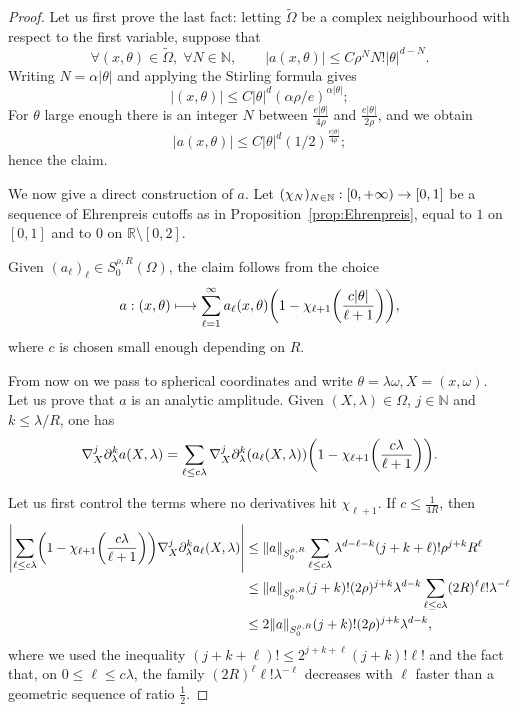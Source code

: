\documentclass[AHL,Unicode,longabstracts,published]{cedram}
\newcommand\1{\mathds{1}}
\newcommand{\R}{\mathbb{R}}
\newcommand{\N}{\mathbb{N}}
\let\oldforall\forall
\renewcommand*{\forall}{\mathrel{\oldforall}}
\renewcommand*{\to}{\mathchoice{\longrightarrow}{\rightarrow}{\rightarrow}{\rightarrow}}
\let\oldmapsto\mapsto
\renewcommand*{\mapsto}{\mathchoice{\longmapsto}{\oldmapsto}{\oldmapsto}{\oldmapsto}}
\let\originalleft\left
\let\originalright\right
\renewcommand{\left}{\mathopen{}\mathclose\bgroup\originalleft}
\renewcommand{\right}{\aftergroup\egroup\originalright}
\begin{document}
\begin{proof}
Let us first prove the last fact: letting $\widetilde{\Omega}$ be a complex neighbourhood with respect to the first variable, suppose that
\[
\forall (x,\theta)\in \widetilde{\Omega}, \;\forall N\in \N,\qquad |a(x,\theta)|\leq C\rho^NN!|\theta|^{d-N}.
\]
Writing $N=\alpha|\theta|$ and applying the Stirling formula gives
\[
|(x,\theta)|\leq C|\theta|^d(\alpha\rho/e)^{\alpha|\theta|} ;
\]
For $\theta$ large enough there is an integer $N$ between $\frac{e|\theta|}{4\rho}$ and $\frac{e|\theta|}{2\rho}$, and we obtain
\[
|a(x,\theta)|\leq C|\theta|^d(1/2)^{\frac{e|\theta|}{4\rho}};
\]
hence the claim.

We now give a direct construction of $a$. Let $(\chi_N)_{N\in \N}:[0,+\infty)\to [0,1]$ be a sequence of Ehrenpreis cutoffs as in Proposition~\ref{prop:Ehrenpreis}, equal to $1$ on $[0,1]$ and to $0$ on $\R\setminus [0,2]$.

Given $(a_\ell)_\ell\in S^{\rho,R}_0(\Omega)$, the claim follows from the choice
\[
a:(x,\theta)\mapsto
\sum_{\ell=1}^{\infty}a_{\ell}(x,\theta)\left(1-\chi_{\ell+1}\left(\frac{c|\theta|}{\ell+1}\right)\right),
\]
where $c$ is chosen small enough depending on $R$.

From now on we pass to spherical coordinates and write $\theta=\lambda\omega,X=(x,\omega)$. Let us prove that $a$ is an analytic amplitude. Given $(X,\lambda)\in \Omega$, $j\in \N$ and $k\leq \lambda/R$, one has
\[
\nabla^j_{X}\partial^k_{\lambda}a(X,\lambda)=\sum_{\ell\leq c\lambda}\nabla^j_{X}\partial^k_{\lambda}(a_{\ell}(X,\lambda))\left(1-\chi_{\ell+1}\left(\frac{c\lambda}{\ell+1}\right)\right).
\]

Let us first control the terms where no derivatives hit $\chi_{\ell+1}$. If $c\leq \frac{1}{4R}$, then
\begin{align*}
\left|\sum_{\ell\leq c\lambda}\left(1-\chi_{\ell+1}\left(\frac{c\lambda}{\ell+1}\right)\right)\nabla^j_{X}\partial^k_{\lambda}a_\ell(X,\lambda)\right| &
\leq \|a\|_{S^{\rho,R}_0}\sum_{\ell\leq c\lambda}\lambda^{d-\ell-k}(j+k+\ell)!\rho^{j+k}R^{\ell}\\
&\leq
\|a\|_{S^{\rho,R}_0}(j+k)!(2\rho)^{j+k}\lambda^{d-k}\sum_{\ell\leq c\lambda}(2R)^{\ell}\ell!\lambda^{-\ell}\\
&\leq 2\|a\|_{S^{\rho,R}_0}(j+k)!(2\rho)^{j+k}\lambda^{d-k},
\end{align*}
where we used the inequality $(j+k+\ell)!\leq 2^{j+k+\ell}(j+k)!\ell!$ and the fact that, on $0\leq \ell\leq c\lambda$, the family $(2R)^{\ell}\ell!\lambda^{-\ell}$ decreases with $\ell$ faster than a geometric sequence of ratio $\frac 12$.


\end{proof}
\end{document}
